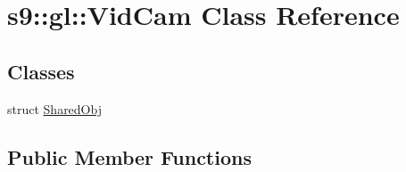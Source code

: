 \hypertarget{classs9_1_1gl_1_1VidCam}{\section{s9\-:\-:gl\-:\-:\-Vid\-Cam \-Class \-Reference}
\label{classs9_1_1gl_1_1VidCam}
}
\subsection*{\-Classes}
\begin{DoxyCompactItemize}
\item 
struct \hyperlink{structs9_1_1gl_1_1VidCam_1_1SharedObj}{\-Shared\-Obj}
\end{DoxyCompactItemize}
\subsection*{\-Public \-Member \-Functions}
